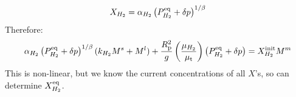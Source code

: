 \begin{equation}
X_{H_2} = \alpha_{H_2} \left( P_{H_2}^{\rm eq} +\delta p \right)^{1/\beta}
\end{equation}
Therefore:
\begin{equation}
\alpha_{H_2} \left( P_{H_2}^{\rm eq} +\delta p \right)^{1/\beta} (k_{H_2} M^s + M^l) + \frac{R_{\rm p}^2}{g} \left( \frac{\mu_{H_2}}{\mu_{\rm t}} \right) \left( P_{H_2}^{\rm eq}+\delta p \right) = X_{H_2}^{\rm init} M^m
\end{equation}
This is non-linear, but we know the current concentrations of all $X$'s, so can determine $X_{H_2}^{\rm eq}$.  



